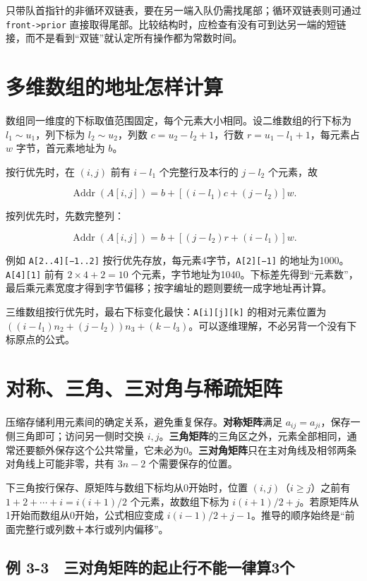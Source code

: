 只带队首指针的非循环双链表，要在另一端入队仍需找尾部；循环双链表则可通过 \texttt{front->\allowbreak{}prior} 直接取得尾部。比较结构时，应检查有没有可到达另一端的短链接，而不是看到``双链''就认定所有操作都为常数时间。

\section{多维数组的地址怎样计算}\label{DS03-05}

数组同一维度的下标取值范围固定，每个元素大小相同。设二维数组的行下标为 \(l_1\sim u_1\)，列下标为 \(l_2\sim u_2\)，列数 \(c=u_2-l_2+1\)，行数 \(r=u_1-l_1+1\)，每元素占 \(w\) 字节，首元素地址为 \(b\)。

按行优先时，在 \((i,j)\) 前有 \(i-l_1\) 个完整行及本行的 \(j-l_2\) 个元素，故

\[\operatorname{Addr}(A[i,j])=b+[(i-l_1)c+(j-l_2)]w.\]

按列优先时，先数完整列：

\[\operatorname{Addr}(A[i,j])=b+[(j-l_2)r+(i-l_1)]w.\]

例如 \texttt{A[2..4][−1..2]} 按行优先存放，每元素4字节，\texttt{A[2][−1]} 的地址为1000。\texttt{A[4][1]} 前有 \(2\times4+2=10\) 个元素，字节地址为1040。下标差先得到``元素数''，最后乘元素宽度才得到字节偏移；按字编址的题则要统一成字地址再计算。

三维数组按行优先时，最右下标变化最快：\texttt{A[i][j][k]} 的相对元素位置为 \(((i-l_1)n_2+(j-l_2))n_3+(k-l_3)\)。可以逐维理解，不必另背一个没有下标原点的公式。

\section{对称、三角、三对角与稀疏矩阵}\label{DS03-06}

压缩存储利用元素间的确定关系，避免重复保存。\textbf{对称矩阵}满足 \(a_{ij}=a_{ji}\)，保存一侧三角即可；访问另一侧时交换 \(i,j\)。\textbf{三角矩阵}的三角区之外，元素全部相同，通常还要额外保存这个公共常量，它未必为0。\textbf{三对角矩阵}只在主对角线及相邻两条对角线上可能非零，共有 \(3n-2\) 个需要保存的位置。

下三角按行保存、原矩阵与数组下标均从0开始时，位置 \((i,j)\)（\(i\ge j\)）之前有 \(1+2+\cdots+i=i(i+1)/2\) 个元素，故数组下标为 \(i(i+1)/2+j\)。若原矩阵从1开始而数组从0开始，公式相应变成 \(i(i-1)/2+j-1\)。推导的顺序始终是``前面完整行或列数＋本行或列内偏移''。

\subsection{例 3-3　三对角矩阵的起止行不能一律算3个}\label{DS03-ex3}

